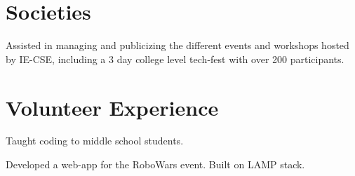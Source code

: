 \documentclass[a4paper]{resume}
\begin{document}
\begin{minipage}[t]{0.66\textwidth}

\section{Societies}


\begin{tightitemize}
\item Assisted in managing and publicizing the different events and workshops hosted by IE-CSE, including a 3 day college level tech-fest with over 200 participants.
\end{tightitemize}

\sectionspace %


\section{Volunteer Experience}

Taught coding to middle school students.


\sectionspace %

Developed a web-app for the RoboWars event. Built on LAMP stack.


\sectionspace %





\end{minipage} %

\end{document}
